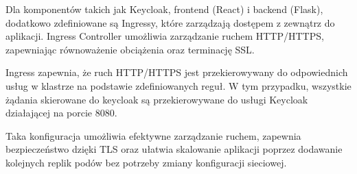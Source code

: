 \documentclass[12pt,a4paper]{article}
\begin{document}
Dla komponentów takich jak Keycloak, frontend (React) i backend (Flask), dodatkowo zdefiniowane są Ingressy, które zarządzają dostępem z zewnątrz do aplikacji. Ingress Controller umożliwia zarządzanie ruchem HTTP/HTTPS, zapewniając równoważenie obciążenia oraz terminację SSL.

Ingress zapewnia, że ruch HTTP/HTTPS jest przekierowywany do odpowiednich usług w klastrze na podstawie zdefiniowanych reguł. W tym przypadku, wszystkie żądania skierowane do keycloak są przekierowywane do usługi Keycloak działającej na porcie 8080.

Taka konfiguracja umożliwia efektywne zarządzanie ruchem, zapewnia bezpieczeństwo dzięki TLS oraz ułatwia skalowanie aplikacji poprzez dodawanie kolejnych replik podów bez potrzeby zmiany konfiguracji sieciowej.



\nocite{*}
\end{document}
